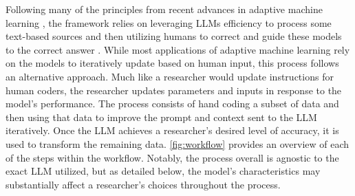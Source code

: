     Following many of the principles from recent advances in adaptive machine learning \citep{enamoradoUsingProbabilisticModel2019,wiedemannProportionalClassificationRevisited2019,millerActiveLearningApproaches2020}, the framework relies on leveraging LLMs efficiency to process some text-based sources and then utilizing humans to correct and guide these models to the correct answer \citep{mozerMatchingTextData2019}. While most applications of adaptive machine learning rely on the models to iteratively update based on human input, this process follows an alternative approach. Much like a researcher would update instructions for human coders, the researcher updates parameters and inputs in response to the model's performance. The process consists of hand coding a subset of data and then using that data to improve the prompt and context sent to the LLM iteratively. Once the LLM achieves a researcher's desired level of accuracy, it is used to transform the remaining data. \autoref{fig:workflow} provides an overview of each of the steps within the workflow. Notably, the process overall is agnostic to the exact LLM utilized, but as detailed below, the model's characteristics may substantially affect a researcher's choices throughout the process.

